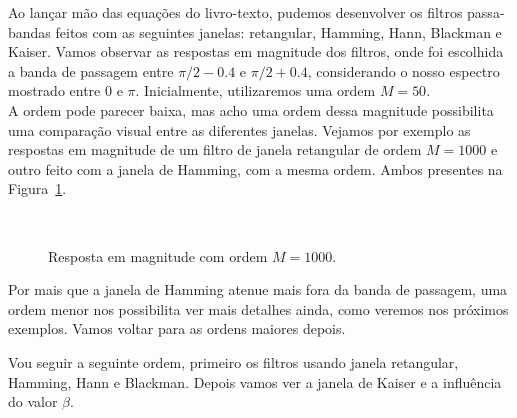 \documentclass{homeworkclass}
\begin{document}
\begin{homeworkProblem}	
Ao lançar mão das equações do livro-texto, pudemos desenvolver os filtros passa-bandas feitos com as seguintes janelas: retangular, Hamming, Hann, Blackman e Kaiser. Vamos observar as respostas em magnitude dos filtros, onde foi escolhida a banda de passagem entre $\pi/2 - 0.4$ e $\pi/2 + 0.4$, considerando o nosso espectro mostrado entre $0$ e $\pi$. Inicialmente, utilizaremos uma ordem $M = 50$. \\ A ordem pode parecer baixa, mas acho uma ordem dessa magnitude possibilita uma comparação visual entre as diferentes janelas. Vejamos por exemplo as respostas em magnitude de um filtro de janela retangular de ordem $M = 1000$ e outro feito com a janela de Hamming, com a mesma ordem. Ambos presentes na Figura~\ref{fig:milzera}.

\begin{figure}[!h]
	\centering
	~
	
	\caption{Resposta em magnitude com ordem $M = 1000$.}
	\label{fig:milzera}
\end{figure}

Por mais que a janela de Hamming atenue mais fora da banda de passagem, uma ordem menor nos possibilita ver mais detalhes ainda, como veremos nos próximos exemplos. Vamos voltar para as ordens maiores depois.

Vou seguir a seguinte ordem, primeiro os filtros usando janela retangular, Hamming, Hann e Blackman. Depois vamos ver a janela de Kaiser e a influência do valor $\beta$. \\


\end{homeworkProblem}
\end{document}
